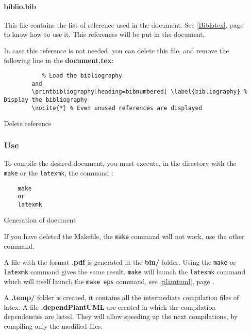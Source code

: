 \paragraph{biblio.bib}
This file contains the list of reference used in the document. See \ref{Biblatex}, page
\pageref{Biblatex} to know how to use it.
This references will be put in the document.\newline

In case this reference is not needed, you can delete this file, and remove the following line in the
\textbf{document.tex}:
\begin{code}
    \begin{verbatim}
           % Load the bibliography
        and
        \printbibliography[heading=bibnumbered] \label{bibliography} % Display the bibliography
        \nocite{*} % Even unused references are displayed
    \end{verbatim}
    \caption{Delete reference}
\end{code}

\subsubsection{Use} \label{use}
To compile the desired document, you must execute, in the directory with the \texttt{make}
or the \texttt{latexmk}, the command :
\begin{code}
    \begin{verbatim}
    make
    or
    latexmk
\end{verbatim}
    \caption{Generation of document}
\end{code}

If you have deleted the Makefile, the \texttt{make} command will not work, use the other
command.\newline

A file with the format \textbf{.pdf} is generated in the \textbf{bin/} folder. Using the
\texttt{make} or \texttt{latexmk} command gives the same result.
\texttt{make} will launch the \texttt{latexmk} command which will itself launch
the \texttt{make eps} command, see \ref{plamtuml}, page \pageref{plamtuml}.\newline

A \textbf{.temp/} folder is created, it contains all the intermediate compilation files of
\gls{latex}.
A file \textbf{.dependPlantUML} are created in which the compilation dependencies are listed.
They will allow speeding up the next compilations, by compiling only the modified files.

